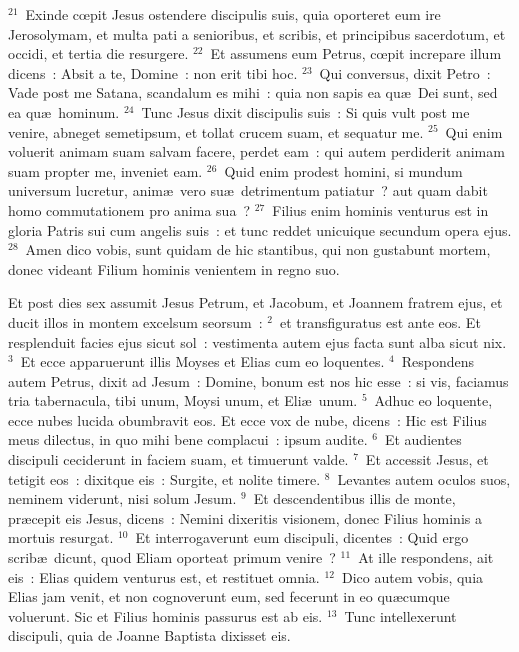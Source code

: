${}^{21}$~Exinde cœpit Jesus ostendere discipulis suis, quia oporteret eum ire Jerosolymam, et multa pati a senioribus, et scribis, et principibus sacerdotum, et occidi, et tertia die resurgere.
${}^{22}$~Et assumens eum Petrus, cœpit increpare illum dicens~: Absit a te, Domine~: non erit tibi hoc.
${}^{23}$~Qui conversus, dixit Petro~: Vade post me Satana, scandalum es mihi~: quia non sapis ea qu\ae\ Dei sunt, sed ea qu\ae\ hominum.
${}^{24}$~Tunc Jesus dixit discipulis suis~: Si quis vult post me venire, abneget semetipsum, et tollat crucem suam, et sequatur me.
${}^{25}$~Qui enim voluerit animam suam salvam facere, perdet eam~: qui autem perdiderit animam suam propter me, inveniet eam.
${}^{26}$~Quid enim prodest homini, si mundum universum lucretur, anim\ae\ vero su\ae\ detrimentum patiatur~? aut quam dabit homo commutationem pro anima sua~?
${}^{27}$~Filius enim hominis venturus est in gloria Patris sui cum angelis suis~: et tunc reddet unicuique secundum opera ejus.
${}^{28}$~Amen dico vobis, sunt quidam de hic stantibus, qui non gustabunt mortem, donec videant Filium hominis venientem in regno suo.

\lettrine[lines=10,image=true,loversize=0.05,lraise=-0.03]{E}{}t post dies sex assumit Jesus Petrum, et Jacobum, et Joannem fratrem ejus, et ducit illos in montem excelsum seorsum~:
${}^{2}$~et transfiguratus est ante eos. Et resplenduit facies ejus sicut sol~: vestimenta autem ejus facta sunt alba sicut nix.
${}^{3}$~Et ecce apparuerunt illis Moyses et Elias cum eo loquentes.
${}^{4}$~Respondens autem Petrus, dixit ad Jesum~: Domine, bonum est nos hic esse~: si vis, faciamus tria tabernacula, tibi unum, Moysi unum, et Eli\ae\ unum.
${}^{5}$~Adhuc eo loquente, ecce nubes lucida obumbravit eos. Et ecce vox de nube, dicens~: Hic est Filius meus dilectus, in quo mihi bene complacui~: ipsum audite.
${}^{6}$~Et audientes discipuli ceciderunt in faciem suam, et timuerunt valde.
${}^{7}$~Et accessit Jesus, et tetigit eos~: dixitque eis~: Surgite, et nolite timere.
${}^{8}$~Levantes autem oculos suos, neminem viderunt, nisi solum Jesum.
${}^{9}$~Et descendentibus illis de monte, pr\ae cepit eis Jesus, dicens~: Nemini dixeritis visionem, donec Filius hominis a mortuis resurgat.
${}^{10}$~Et interrogaverunt eum discipuli, dicentes~: Quid ergo scrib\ae\ dicunt, quod Eliam oporteat primum venire~?
${}^{11}$~At ille respondens, ait eis~: Elias quidem venturus est, et restituet omnia.
${}^{12}$~Dico autem vobis, quia Elias jam venit, et non cognoverunt eum, sed fecerunt in eo qu\ae cumque voluerunt. Sic et Filius hominis passurus est ab eis.
${}^{13}$~Tunc intellexerunt discipuli, quia de Joanne Baptista dixisset eis.


